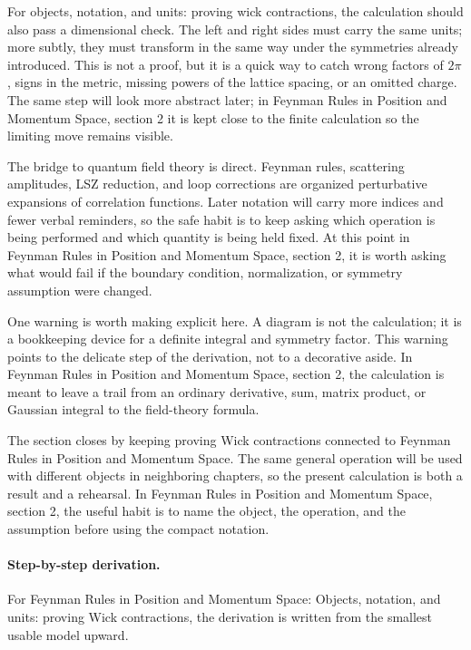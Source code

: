 For objects, notation, and units: proving wick contractions, the calculation should also pass a dimensional check.  The left and right sides must carry the same units; more subtly, they must transform in the same way under the symmetries already introduced.  This is not a proof, but it is a quick way to catch wrong factors of \(2\pi\), signs in the metric, missing powers of the lattice spacing, or an omitted charge.  The same step will look more abstract later; in Feynman Rules in Position and Momentum Space, section 2 it is kept close to the finite calculation so the limiting move remains visible.

The bridge to quantum field theory is direct.  Feynman rules, scattering amplitudes, LSZ reduction, and loop corrections are organized perturbative expansions of correlation functions.  Later notation will carry more indices and fewer verbal reminders, so the safe habit is to keep asking which operation is being performed and which quantity is being held fixed.  At this point in Feynman Rules in Position and Momentum Space, section 2, it is worth asking what would fail if the boundary condition, normalization, or symmetry assumption were changed.

One warning is worth making explicit here.  A diagram is not the calculation; it is a bookkeeping device for a definite integral and symmetry factor.  This warning points to the delicate step of the derivation, not to a decorative aside.  In Feynman Rules in Position and Momentum Space, section 2, the calculation is meant to leave a trail from an ordinary derivative, sum, matrix product, or Gaussian integral to the field-theory formula.

The section closes by keeping proving Wick contractions connected to Feynman Rules in Position and Momentum Space.  The same general operation will be used with different objects in neighboring chapters, so the present calculation is both a result and a rehearsal.  In Feynman Rules in Position and Momentum Space, section 2, the useful habit is to name the object, the operation, and the assumption before using the compact notation.



\paragraph{Step-by-step derivation.}

For Feynman Rules in Position and Momentum Space: Objects, notation, and units: proving Wick contractions, the derivation is written from the smallest usable model upward.

